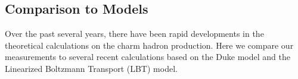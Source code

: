 \documentclass[%
 reprint,	
 amsmath,amssymb,
 aps,
 prc,
]{revtex4-1}
\begin{document}
\begin{table}[t]
\label{table:d0bard0ratio}
\end{table}




\subsection{\label{result:theory}Comparison to Models}

Over the past several years, there have been rapid developments in the theoretical calculations on the charm hadron production. Here we compare our measurements to several recent calculations based on the Duke model and the Linearized Boltzmann Transport (LBT) model.
\end{document}
